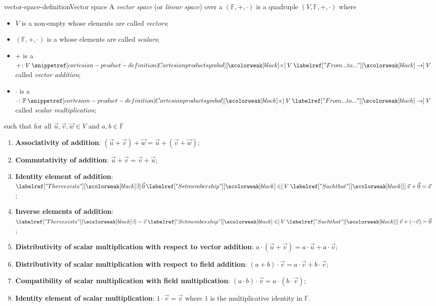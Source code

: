 \documentclass[preview]{standalone}
\begin{document}
\begin{snippetdefinition}{vector-space-definition}{Vector space}
    A \textit{vector space} (or \textit{linear space}) over a \field \((\mathbb{F}, +, \cdot)\) is a quadruple
    \((V, \mathbb{F}, +, \cdot)\) where
    \begin{itemize}
        \item \(V\) is a non-empty \set whose elements are called \textit{vectors};
        \item \((\mathbb{F}, +, \cdot)\) is a \field whose elements are called \textit{scalars};
        \item \(+\) is a \binoperation \(+\colon V \cartesianprod V \fromto V\) called \textit{vector addition};
        \item \(\cdot\) is a \binoperation \(\cdot\colon \mathbb{F} \cartesianprod V \fromto V\) called \textit{scalar multiplication};
    \end{itemize}
    such that for all \(\vec{u}, \vec{v}, \vec{w} \in V\) and \(a,b \in \mathbb{F}\)
    \begin{enumerate}
        \item \textbf{Associativity of addition}: 
        \((\vec{u} + \vec{v}) + \vec{w} = \vec{u} + (\vec{v} + \vec{w})\);
        \item \textbf{Commutativity of addition}: 
        \(\vec{u} + \vec{v} = \vec{v} + \vec{u}\);
        \item \textbf{Identity element of addition}: \(\exists\, \vec{0} \in V \suchthat
        \vec{v} + \vec{0} = \vec{v} \);
        \item \textbf{Inverse elements of addition}: \(\exists -\vec{v} \in V \suchthat 
        \vec{v} + (-\vec{v}) = \vec{0}\);
        \item \textbf{Distributivity of scalar multiplication with respect to vector addition}: 
        \(a \cdot (\vec{u} + \vec{v}) = a \cdot \vec{u} + a \cdot \vec{v}\);
        \item \textbf{Distributivity of scalar multiplication with respect to field addition}: 
        \((a + b) \cdot \vec{v} = a \cdot \vec{v} + b \cdot \vec{v}\);
        \item \textbf{Compatibility of scalar multiplication with field multiplication}: 
        \((a \cdot b) \cdot \vec{v} = a \cdot (b \cdot \vec{v})\);
        \item \textbf{Identity element of scalar multiplication}: 
        \(1 \cdot \vec{v} = \vec{v}\)
        where \(1\) is the multiplicative identity in \(\mathbb{F}\).
    \end{enumerate}
\end{snippetdefinition}
\end{document}
